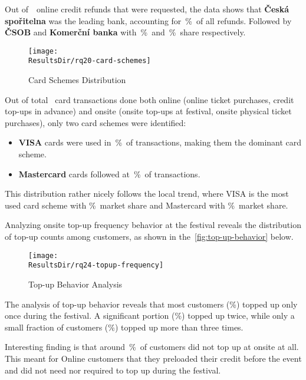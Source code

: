 Out of~~online credit refunds that were requested, the data shows that \textbf{Česká spořitelna} was the leading bank, accounting for~\%~of all refunds.
Followed by \textbf{ČSOB} and \textbf{Komerční banka} with~\%~and~\%~share respectively.


\begin{figure}[H]
	\centering
	\texttt{[image: \\ResultsDir/rq20-card-schemes]}
	\caption{Card Schemes Distribution}
	\label{fig:card-schemes}
	\source
\end{figure}

Out of total ~card transactions done both online (online ticket purchases, credit top-ups in advance) and onsite (onsite top-ups at festival, onsite physical ticket purchases), only two card schemes were identified:
\begin{itemize}
	\item \textbf{VISA} cards were used in~\%~of transactions, making them the dominant card scheme.
	\item \textbf{Mastercard} cards followed at~\%~of transactions.
\end{itemize}

This distribution rather nicely follows the local trend, where VISA is the most used card scheme with \%~market share and Mastercard with \%~market share\cite{spbk_czech_profil_karty}.


Analyzing onsite top-up frequency behavior at the festival reveals the distribution of top-up counts among customers, as shown in the~\autoref{fig:top-up-behavior} below.

\begin{figure}[H]
	\centering
	\texttt{[image: \\ResultsDir/rq24-topup-frequency]}
	\caption{Top-up Behavior Analysis}
	\label{fig:top-up-behavior}
	\source
\end{figure}

The analysis of top-up behavior reveals that most customers (\%) topped up only once during the festival.
A significant portion (\%) topped up twice, while only a small fraction of customers (\%) topped up more than three times.

Interesting finding is that around~\%~of customers did not top up at onsite at all.
This meant for Online customers that they preloaded their credit before the event and did not need nor required to top up during the festival.

